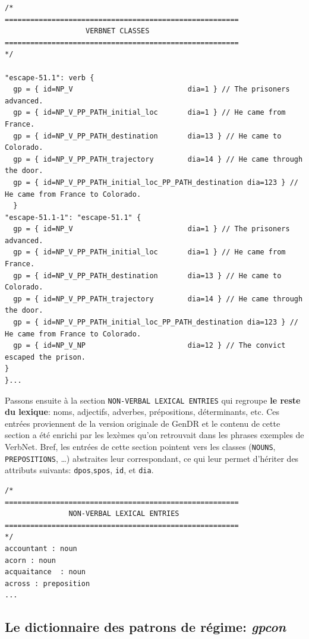 \begin{lstlisting}[language=mate, caption = Extrait du \emph{lexicon}: classes de VerbNet, label=fig:vnclass]
/*
=======================================================
                   VERBNET CLASSES
=======================================================
*/

"escape-51.1": verb {
  gp = { id=NP_V                           dia=1 } // The prisoners advanced.
  gp = { id=NP_V_PP_PATH_initial_loc       dia=1 } // He came from France.
  gp = { id=NP_V_PP_PATH_destination       dia=13 } // He came to Colorado.
  gp = { id=NP_V_PP_PATH_trajectory        dia=14 } // He came through the door.
  gp = { id=NP_V_PP_PATH_initial_loc_PP_PATH_destination dia=123 } // He came from France to Colorado.
  }
"escape-51.1-1": "escape-51.1" {
  gp = { id=NP_V                           dia=1 } // The prisoners advanced.
  gp = { id=NP_V_PP_PATH_initial_loc       dia=1 } // He came from France.
  gp = { id=NP_V_PP_PATH_destination       dia=13 } // He came to Colorado.
  gp = { id=NP_V_PP_PATH_trajectory        dia=14 } // He came through the door.
  gp = { id=NP_V_PP_PATH_initial_loc_PP_PATH_destination dia=123 } // He came from France to Colorado.
  gp = { id=NP_V_NP                        dia=12 } // The convict escaped the prison.
}
}...
\end{lstlisting}

Passons ensuite à la section \texttt{NON-VERBAL LEXICAL ENTRIES} qui regroupe \textbf{le reste du lexique}: noms, adjectifs, adverbes, prépositions, déterminants, etc. Ces entrées proviennent de la version originale de GenDR \citep{lareau18} et le contenu de cette section a été enrichi par les lexèmes qu'on retrouvait dans les phrases exemples de VerbNet. Bref, les entrées de cette section pointent vers les classes (\texttt{NOUNS}, \texttt{PREPOSITIONS}, \ldots) abstraites leur correspondant, ce qui leur permet d'hériter des attributs suivants: \texttt{dpos},\texttt{spos}, \texttt{id}, et \texttt{dia}.

\begin{lstlisting}[language=mate, caption = Extrait du \emph{lexicon}: unités lexicales non-verbales]
/*
=======================================================
               NON-VERBAL LEXICAL ENTRIES     
=======================================================
*/
accountant : noun
acorn : noun
acquaitance  : noun
across : preposition
...
\end{lstlisting}

\subsection{Le dictionnaire des patrons de régime: \emph{gpcon}}

